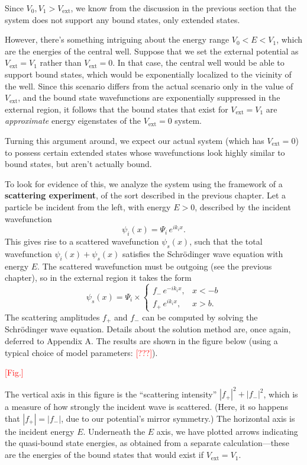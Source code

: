 \documentclass[pra,11pt]{revtex4}
\begin{document}
Since $V_0, V_1 > V_{\mathrm{ext}}$, we know from the discussion in
the previous section that the system does not support any bound
states, only extended states.

However, there's something intriguing about the energy range $V_0 < E
< V_1$, which are the energies of the central well.  Suppose that we
set the external potential as $V_{\mathrm{ext}} = V_1$ rather than
$V_{\mathrm{ext}} = 0$.  In that case, the central well would be able
to support bound states, which would be exponentially localized to the
vicinity of the well.  Since this scenario differs from the actual
scenario only in the value of $V_{\mathrm{ext}}$, and the bound state
wavefunctions are exponentially suppressed in the external region, it
follows that the bound states that exist for $V_{\mathrm{ext}} = V_1$
are \textit{approximate} energy eigenstates of the $V_{\mathrm{ext}} =
0$ system.

Turning this argument around, we expect our actual system (which has
$V_{\mathrm{ext}} = 0$) to possess certain extended states whose
wavefunctions look highly similar to bound states, but aren't actually
bound.

To look for evidence of this, we analyze the system using the
framework of a \textbf{scattering experiment}, of the sort described
in the previous chapter.  Let a particle be incident from the left,
with energy $E > 0$, described by the incident wavefunction
$$\psi_i(x) = \Psi_i \, e^{ik_i x}.$$
This gives rise to a scattered wavefunction $\psi_s(x)$, such that the
total wavefunction $\psi_i(x) + \psi_s(x)$ satisfies the Schr\"odinger
wave equation with energy $E$.  The scattered wavefunction must be
outgoing (see the previous chapter), so in the external region it
takes the form
$$\psi_s(x) = \Psi_i \times \begin{cases}f_- \,e^{-ik_ix}, & x < -b \\ f_+ \,e^{ik_ix}, & x > b.\end{cases}$$
The scattering amplitudes $f_+$ and $f_-$ can be computed by solving
the Schr\"odinger wave equation.  Details about the solution method
are, once again, deferred to Appendix A.  The results are shown in the
figure below (using a typical choice of model parameters:
\textcolor{red}{[???]}).

\textcolor{red}{[Fig.]}

The vertical axis in this figure is the ``scattering intensity''
$|f_+|^2 + |f_-|^2$, which is a measure of how strongly the incident
wave is scattered.  (Here, it so happens that $|f_+| = |f_-|$, due to
our potential's mirror symmetry.)  The horizontal axis is the incident
energy $E$.  Underneath the $E$ axis, we have plotted arrows
indicating the quasi-bound state energies, as obtained from a separate
calculation---these are the energies of the bound states that would
exist if $V_{\mathrm{ext}} = V_1$.
\end{document}
